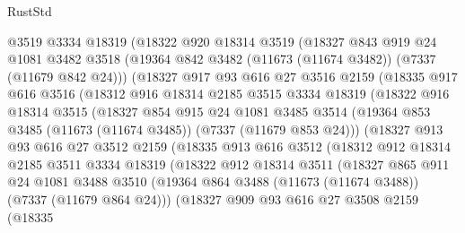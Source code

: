 \begin{lexlean}{RustStd}
\begin{coremodule}
        @3519
        @3334
        @18319
        (@18322
          @920
          @18314
          @3519
          (@18327
            @843
            @919
            @24
            @1081
            @3482
            @3518
            (@19364 @842 @3482 (@11673 (@11674 @3482)) (@7337 (@11679 @842 @24)))
            (@18327
              @917
              @93
              @616
              @27
              @3516
              @2159
              (@18335
                @917
                @616
                @3516
                (@18312
                  @916
                  @18314
                  @2185
                  @3515
                  @3334
                  @18319
                  (@18322
                    @916
                    @18314
                    @3515
                    (@18327
                      @854
                      @915
                      @24
                      @1081
                      @3485
                      @3514
                      (@19364 @853 @3485 (@11673 (@11674 @3485)) (@7337 (@11679 @853 @24)))
                      (@18327
                        @913
                        @93
                        @616
                        @27
                        @3512
                        @2159
                        (@18335
                          @913
                          @616
                          @3512
                          (@18312
                            @912
                            @18314
                            @2185
                            @3511
                            @3334
                            @18319
                            (@18322
                              @912
                              @18314
                              @3511
                              (@18327
                                @865
                                @911
                                @24
                                @1081
                                @3488
                                @3510
                                (@19364
                                  @864
                                  @3488
                                  (@11673 (@11674 @3488))
                                  (@7337 (@11679 @864 @24)))
                                (@18327
                                  @909
                                  @93
                                  @616
                                  @27
                                  @3508
                                  @2159
                                  (@18335

\end{coremodule}
\end{lexlean}
